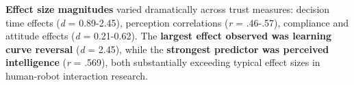 \documentclass[12pt]{article}
\begin{document}
\textbf{Effect size magnitudes} varied dramatically across trust measures: decision time effects (\textit{d} = 0.89-2.45), perception correlations (\textit{r} = .46-.57), compliance and attitude effects (\textit{d} = 0.21-0.62). The \textbf{largest effect observed was learning curve reversal} (\textit{d} = 2.45), while the \textbf{strongest predictor was perceived intelligence} (\textit{r} = .569), both substantially exceeding typical effect sizes in human-robot interaction research.



\end{document}
